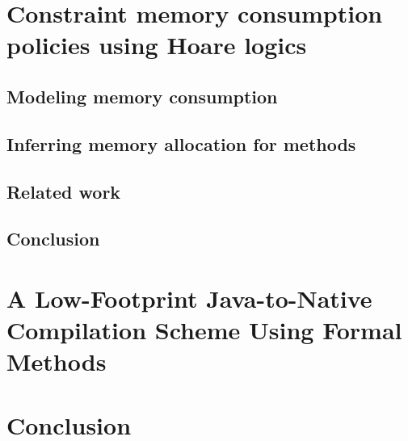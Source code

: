 \documentclass[book,10pt]{book}
\begin{document}
   \chapter{Constraint memory consumption policies using Hoare logics}
       
       \lstset{numbers=none}
       
       \section{Modeling memory consumption}\label{sec:verif}
       
       \section{Inferring memory allocation for methods}\label{sec:infer}
       
       \section{Related work}\label{sec:rel}
       
       \section{Conclusion}\label{sec:conc}
       

 
  \chapter{A Low-Footprint Java-to-Native Compilation Scheme Using Formal Methods}
      \lstset{frameround=tttt}
      
      
      
      
      
      
       
       
      
       
 
\chapter{Conclusion}

\appendix



\end{document}
